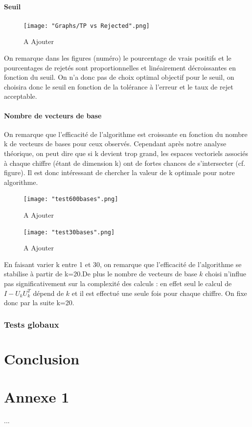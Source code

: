 \documentclass[a4paper,11pt,twoside]{report}
\begin{document}
\subsubsection{Seuil}
\begin{figure}[H]
  	\texttt{[image: "Graphs/TP vs Rejected".png]}
  	\caption{A Ajouter}
\end{figure}

	
On remarque dans les figures (numéro) le pourcentage de vrais positifs et le pourcentages de rejetés sont proportionnelles et linéairement décroissantes en fonction du seuil. On n'a donc pas de choix optimal objectif pour le seuil, on choisira donc le seuil en fonction de la tolérance à l'erreur et le taux de rejet acceptable. 

\subsubsection{Nombre de vecteurs de base}
On remarque que l'efficacité de l'algorithme est croissante en fonction du nombre k de vecteurs de bases pour ceux observés. Cependant après notre analyse théorique, on peut dire que si k devient trop grand, les espaces vectoriels associés à chaque chiffre (étant de dimension k) ont de fortes chances de s'intersecter (cf. figure). Il est donc intéressant de chercher la valeur de k optimale pour notre algorithme.
\begin{figure}[H]
  	\texttt{[image: "test600bases".png]}
  	\caption{A Ajouter}
\end{figure}

\begin{figure}[H]
  	\texttt{[image: "test30bases".png]}
  	\caption{A Ajouter}
\end{figure}
En faisant varier k entre 1 et 30, on remarque que l'efficacité de l'algorithme se stabilise à partir de k=20.De plus le nombre de vecteurs de base $k$ choisi n'influe pas significativement sur la complexité des calculs : en effet seul le calcul de $I-U_{k}U_{k}^{T}$ dépend de $k$ et il est effectué une seule fois pour chaque chiffre. On fixe donc par la suite k=20.

\subsection{Tests globaux}



\chapter{Conclusion}

  
\nocite{*} 

%
\cleardoublepage

\appendix

\chapter{Annexe 1}
...
\end{document}
